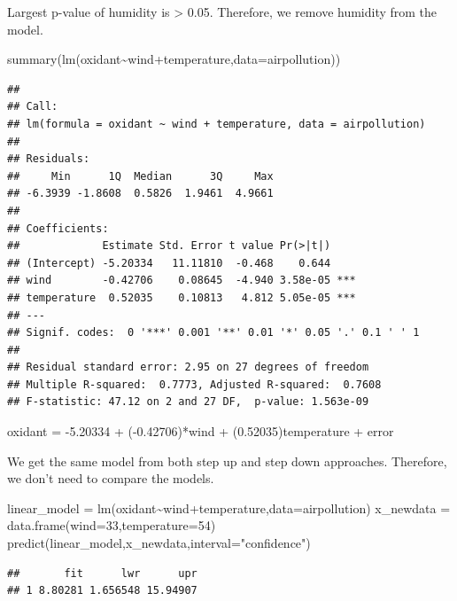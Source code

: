 \documentclass[
]{article}
\newenvironment{Shaded}{\begin{snugshade}}{\end{snugshade}}
\newcommand{\AttributeTok}[1]{\textcolor[rgb]{0.77,0.63,0.00}{#1}}
\newcommand{\DecValTok}[1]{\textcolor[rgb]{0.00,0.00,0.81}{#1}}
\newcommand{\FunctionTok}[1]{\textcolor[rgb]{0.00,0.00,0.00}{#1}}
\newcommand{\NormalTok}[1]{#1}
\newcommand{\OtherTok}[1]{\textcolor[rgb]{0.56,0.35,0.01}{#1}}
\newcommand{\SpecialCharTok}[1]{\textcolor[rgb]{0.00,0.00,0.00}{#1}}
\newcommand{\StringTok}[1]{\textcolor[rgb]{0.31,0.60,0.02}{#1}}
\begin{document}
Largest p-value of humidity is \textgreater{} 0.05. Therefore, we remove
humidity from the model.

\begin{Shaded}
\begin{Highlighting}[]
\FunctionTok{summary}\NormalTok{(}\FunctionTok{lm}\NormalTok{(oxidant}\SpecialCharTok{\textasciitilde{}}\NormalTok{wind}\SpecialCharTok{+}\NormalTok{temperature,}\AttributeTok{data=}\NormalTok{airpollution))}
\end{Highlighting}
\end{Shaded}

\begin{verbatim}
## 
## Call:
## lm(formula = oxidant ~ wind + temperature, data = airpollution)
## 
## Residuals:
##     Min      1Q  Median      3Q     Max 
## -6.3939 -1.8608  0.5826  1.9461  4.9661 
## 
## Coefficients:
##             Estimate Std. Error t value Pr(>|t|)    
## (Intercept) -5.20334   11.11810  -0.468    0.644    
## wind        -0.42706    0.08645  -4.940 3.58e-05 ***
## temperature  0.52035    0.10813   4.812 5.05e-05 ***
## ---
## Signif. codes:  0 '***' 0.001 '**' 0.01 '*' 0.05 '.' 0.1 ' ' 1
## 
## Residual standard error: 2.95 on 27 degrees of freedom
## Multiple R-squared:  0.7773, Adjusted R-squared:  0.7608 
## F-statistic: 47.12 on 2 and 27 DF,  p-value: 1.563e-09
\end{verbatim}

oxidant = -5.20334 + (-0.42706)*wind + (0.52035)temperature + error

We get the same model from both step up and step down approaches.
Therefore, we don't need to compare the models.

\begin{Shaded}
\begin{Highlighting}[]
\NormalTok{linear\_model }\OtherTok{=} \FunctionTok{lm}\NormalTok{(oxidant}\SpecialCharTok{\textasciitilde{}}\NormalTok{wind}\SpecialCharTok{+}\NormalTok{temperature,}\AttributeTok{data=}\NormalTok{airpollution)}
\NormalTok{x\_newdata }\OtherTok{=} \FunctionTok{data.frame}\NormalTok{(}\AttributeTok{wind=}\DecValTok{33}\NormalTok{,}\AttributeTok{temperature=}\DecValTok{54}\NormalTok{)}
\FunctionTok{predict}\NormalTok{(linear\_model,x\_newdata,}\AttributeTok{interval=}\StringTok{"confidence"}\NormalTok{)}
\end{Highlighting}
\end{Shaded}

\begin{verbatim}
##       fit      lwr      upr
## 1 8.80281 1.656548 15.94907
\end{verbatim}
\end{document}
